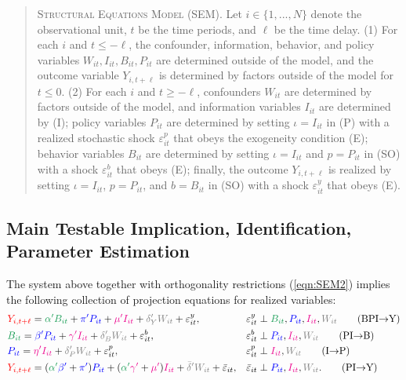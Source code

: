\documentclass[11pt,reqno,letter]{amsart}
\theoremstyle{definition}
\renewcommand{\to}{{\rightarrow}}
\def\bcolor{\color{ForestGreen}}
\def\pcolor{\color{blue}}
\def\icolor{\color{magenta}}
\def\wcolor{\color{gray}}
\def\ycolor{\color{red}}
\begin{document}
\begin{quote}
\textsc{Structural Equations Model (SEM)}.  Let $i \in \{1,..., N\}$ denote the observational unit,  $t$ be the time periods, and $\ell$ be the time delay.  (1) For each $i$ and $t \leq -\ell$, the confounder, information, behavior, and policy variables $W_{it}, I_{it},  B_{it}, P_{it}$ are determined outside of the model, and the outcome variable $Y_{i, t+\ell}$ is determined by factors outside of the model for $t \leq 0$.  (2) For each $i$ and $t \geq -\ell$, confounders $W_{it}$ are  determined by factors outside of the model, and information variables $I_{it}$ are determined  by (I); policy variables $P_{it}$ are determined by setting $\iota = I_{it}$  in (P) with  a realized stochastic shock $\varepsilon^p_{it}$ that obeys the exogeneity condition (E);  behavior variables $B_{it}$ are determined by setting $\iota = I_{it}$ and $p= P_{it}$ in  (SO) with a shock $\varepsilon^b_{it}$ that obeys (E); finally, the outcome $Y_{i, t + \ell}$ is realized by setting $\iota = I_{it}$, $p= P_{it}$, and $b = B_{it}$ in  (SO) with a shock $\varepsilon^y_{it}$ that obeys (E). \end{quote}




\subsection{Main Testable Implication, Identification, Parameter Estimation}

The system above together with  orthogonality restrictions (\ref{eqn:SEM2}) implies the following collection of projection equations for realized variables:
\begin{align}
   &  {\ycolor  Y_{i,t+\ell}}
    = {\bcolor\alpha ' B_{it}} + {\pcolor\pi 'P_{it}} + {\icolor\mu'I_{it}} + {\wcolor\delta_Y 'W_{it}}  + \varepsilon^y_{it},
    &  & \varepsilon^y_{it} \perp {\bcolor B_{it}}, {\pcolor P_{it}}, {\icolor I_{it}}, {\wcolor W_{it}} \label{eq:R1} \tag{BPI$\to$Y} \\
    &  {\bcolor B_{it}}
     =  {\pcolor \beta' P_{it}} + {\icolor \gamma'I_{it}} +  {\wcolor \delta_B' W_{it}} + \varepsilon^b_{it},
   & & \varepsilon^b_{it} \perp {\pcolor P_{it}}, {\icolor I_{it}}, {\wcolor W_{it}}  \label{eq:R2} \tag{PI$\to$B}  \\
    & {\pcolor P_{it}}
    =  {\icolor\eta'I_{it}} + {\wcolor \delta_P' W_{it}} +   \varepsilon^p_{it},   & & \varepsilon^p_{it} \perp   {\icolor I_{it}}, {\wcolor W_{it}}  \label{eq:R3}  \tag{I$\to$P} \\
    &  {\ycolor  Y_{i,t+\ell}}
   =     ( {\bcolor\alpha '}  {\pcolor \beta' }+{\pcolor\pi'} )   {\pcolor P_{it}} +    ( {\bcolor\alpha '}  {\icolor \gamma'} + {\icolor \mu'}){\icolor I_{it} }+ {\wcolor \bar{\delta} '}{\wcolor W_{it}}  + {\bar \varepsilon}_{it},  &&  {\bar \varepsilon}_{it} \perp
  {\pcolor P_{it}},  {\icolor I_{it}}, {\wcolor W_{it}}.  \label{eq:R4} \tag{PI$\to$Y}
      \end{align}
\end{document}

